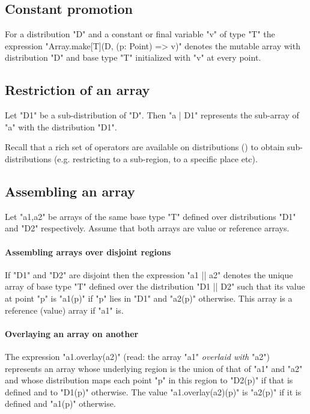 \subsection{Constant promotion}\label{ConstantArray}

For a distribution \xcd"D" and a constant or final variable \xcd"v" of
type \xcd"T" the expression \xcd"Array.make[T](D, (p: Point) => v)"
denotes the mutable array with
distribution \xcd"D" and base type \xcd"T" initialized with \xcd"v"
at every point.

\subsection{Restriction of an array}

Let \xcd"D1" be a sub-distribution of \xcd"D". Then \xcd"a | D1"
represents the sub-array of \xcd"a" with the distribution \xcd"D1".

Recall that a rich set of operators are available on distributions
() to obtain sub-distributions
(e.g. restricting to a sub-region, to a specific place etc).

\subsection{Assembling an array}
Let \xcd"a1,a2" be arrays of the same base type \xcd"T" defined over
distributions \xcd"D1" and \xcd"D2" respectively. Assume that both
arrays are value or reference arrays. 
\paragraph{Assembling arrays over disjoint regions}

If \xcd"D1" and \xcd"D2" are disjoint then the expression \xcd"a1 || a2" denotes the unique array of base type \xcd"T" defined over the
distribution \xcd"D1 || D2" such that its value at point \xcd"p" is
\xcd"a1(p)" if \xcd"p" lies in \xcd"D1" and \xcd"a2(p)"
otherwise. This array is a reference (value) array if \xcd"a1" is.

\paragraph{Overlaying an array on another}
The expression
\xcd"a1.overlay(a2)" (read: the array \xcd"a1" {\em overlaid with} \xcd"a2")
represents an array whose underlying region is the union of that of
\xcd"a1" and \xcd"a2" and whose distribution maps each point \xcd"p"
in this region to \xcd"D2(p)" if that is defined and to \xcd"D1(p)"
otherwise. The value \xcd"a1.overlay(a2)(p)" is \xcd"a2(p)" if it is defined and \xcd"a1(p)" otherwise.

